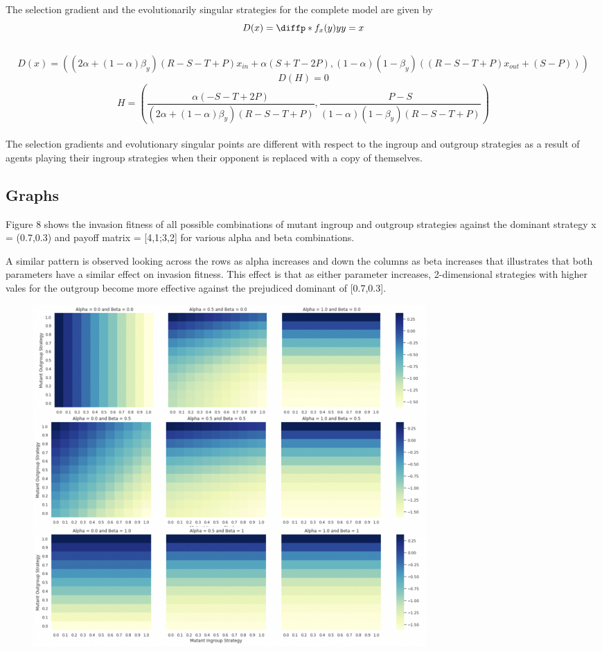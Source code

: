 \documentclass[]{llncs}
\begin{document}
The selection gradient and the evolutionarily singular strategies for the complete model are given by
\[
D(x) = \diffp*{f_x(y)}{y}{y=x}
\]
\\
\[
D(x) = ((2\alpha + (1-\alpha)\beta_y)(R - S - T + P) x_{in} + \alpha(S+T-2P), (1-\alpha)(1-\beta_y)((R - S - T + P) x_{out} + (S-P)))
\]
\[
D(H) = 0
\]
\[
H = (\frac{\alpha(-S-T+2P)}{(2\alpha + (1-\alpha)\beta_y)(R - S - T + P)}, \frac{P-S}{(1-\alpha)(1-\beta_y)(R - S - T +P)}) 
\]
\\
The selection gradients and evolutionary singular points are different with respect to the ingroup and outgroup strategies as a result of agents playing their ingroup strategies when their opponent is replaced with a copy of themselves. 

\subsection{Graphs}

Figure 8 shows the invasion fitness of all possible combinations of mutant ingroup and outgroup strategies against the dominant strategy x = (0.7,0.3) and payoff matrix = [4,1;3,2] for various alpha and beta combinations. 

A similar pattern is observed looking across the rows as alpha increases and down the columns as beta increases that illustrates that both parameters have a similar effect on invasion fitness. This effect is that as either parameter increases, 2-dimensional strategies with higher vales for the outgroup become more effective against the prejudiced dominant of [0.7,0.3]. 

\begin{figure}
\centering
\includegraphics[width=15cm]{images/alpha_beta}
\caption{ }
\end{figure}
\end{document}
